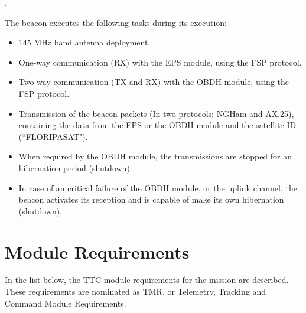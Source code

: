 \documentclass[12pt]{book}
\begin{document}

\cite{site}.

\cite{github}

The beacon executes the following tasks during its execution:

\begin{itemize}
	\item 145 MHz band antenna deployment.
	\item One-way communication (RX) with the EPS module, using the FSP protocol.
	\item Two-way communication (TX and RX) with the OBDH module, using the FSP protocol.
	\item Transmission of the beacon packets (In two protocols: NGHam and AX.25), containing the data from the EPS or the OBDH module and the satellite ID (``FLORIPASAT").
	\item When required by the OBDH module, the transmissions are stopped for an hibernation period (shutdown).
	\item In case of an critical failure of the OBDH module, or the uplink channel, the beacon activates its reception and is capable of make its own hibernation (shutdown).
\end{itemize}

\section{Module Requirements}

In the list below, the TTC module requirements for the mission are described. These requirements are nominated as TMR, or Telemetry, Tracking and Command Module Requirements.
\end{document}
